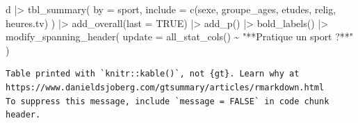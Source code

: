 \documentclass[
  letterpaper,
  DIV=11,
  numbers=noendperiod,
  oneside]{scrreprt}
\newenvironment{Shaded}{\begin{snugshade}}{\end{snugshade}}
\newcommand{\AttributeTok}[1]{\textcolor[rgb]{0.40,0.45,0.13}{#1}}
\newcommand{\ConstantTok}[1]{\textcolor[rgb]{0.56,0.35,0.01}{#1}}
\newcommand{\FunctionTok}[1]{\textcolor[rgb]{0.28,0.35,0.67}{#1}}
\newcommand{\NormalTok}[1]{\textcolor[rgb]{0.00,0.23,0.31}{#1}}
\newcommand{\SpecialCharTok}[1]{\textcolor[rgb]{0.37,0.37,0.37}{#1}}
\newcommand{\StringTok}[1]{\textcolor[rgb]{0.13,0.47,0.30}{#1}}
\begin{document}
\begin{Shaded}
\begin{Highlighting}[]
\NormalTok{d }\SpecialCharTok{|\textgreater{}} 
  \FunctionTok{tbl\_summary}\NormalTok{(}
    \AttributeTok{by =}\NormalTok{ sport,}
    \AttributeTok{include =} \FunctionTok{c}\NormalTok{(sexe, groupe\_ages, etudes, relig, heures.tv)}
\NormalTok{  ) }\SpecialCharTok{|\textgreater{}}
  \FunctionTok{add\_overall}\NormalTok{(}\AttributeTok{last =} \ConstantTok{TRUE}\NormalTok{) }\SpecialCharTok{|\textgreater{}} 
  \FunctionTok{add\_p}\NormalTok{() }\SpecialCharTok{|\textgreater{}} 
  \FunctionTok{bold\_labels}\NormalTok{() }\SpecialCharTok{|\textgreater{}} 
  \FunctionTok{modify\_spanning\_header}\NormalTok{(}
    \AttributeTok{update =} \FunctionTok{all\_stat\_cols}\NormalTok{() }\SpecialCharTok{\textasciitilde{}} \StringTok{"**Pratique un sport ?**"}
\NormalTok{  )}
\end{Highlighting}
\end{Shaded}

\begin{verbatim}
Table printed with `knitr::kable()`, not {gt}. Learn why at
https://www.danieldsjoberg.com/gtsummary/articles/rmarkdown.html
To suppress this message, include `message = FALSE` in code chunk header.
\end{verbatim}
\end{document}
